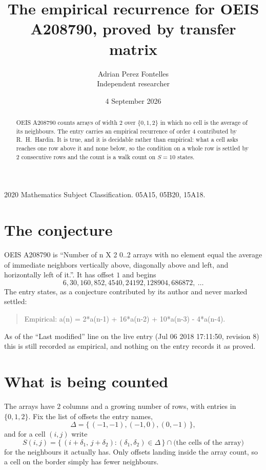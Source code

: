 \documentclass[11pt,a4paper]{article}
\title{The empirical recurrence for OEIS A208790, proved by transfer matrix}
\author{Adrian Perez Fontelles\\ \small Independent researcher}
\date{4 September 2026}
\theoremstyle{plain}
\theoremstyle{definition}
\begin{document}
\maketitle

\begin{abstract}
OEIS A208790 counts arrays of width $2$ over $\{0,1,2\}$ in which no cell is the average of its neighbours. The entry carries an
empirical recurrence of order $4$ contributed by R.~H.~Hardin. It is true, and it is
decidable rather than empirical: what a cell asks reaches one row above
it and none below, so the condition on a whole row is settled by
$2$ consecutive rows and the count is a walk count on $S=10$ states.
\end{abstract}

\noindent\small 2020 Mathematics Subject Classification. 05A15, 05B20, 15A18.\normalsize

\section{The conjecture}

OEIS A208790 is ``Number of n X 2 0..2 arrays with no element equal the average of immediate neighbors vertically above, diagonally above and left, and horizontally left of it.''. It has offset $1$ and begins
\[
6, 30, 160, 852, 4540, 24192, 128904, 686872,\ \dots
\]
The entry states, as a conjecture contributed by its author and never marked settled:
\begin{quote}
Empirical: a(n) = 2*a(n-1) + 16*a(n-2) + 10*a(n-3) - 4*a(n-4).
\end{quote}
As of the ``Last modified'' line on the live entry (Jul 06 2018 17:11:50, revision 8) this is still
recorded as empirical, and nothing on the entry records it as proved.

\section{What is being counted}

The arrays have $2$ columns and a growing number of rows, with entries in $\{0,1,2\}$. Fix the
list of offsets the entry names,
\[
\Delta=\{\,(-1,-1), (-1,0), (0,-1)\,\},
\]
and for a cell $(i,j)$ write
\[
S(i,j)=\{\,(i+\delta_1,\,j+\delta_2) : (\delta_1,\delta_2)\in\Delta\,\}\cap
\text{(the cells of the array)}
\]
for the neighbours it actually has. Only offsets landing inside the array count, so a cell on
the border simply has fewer neighbours.
\end{document}
